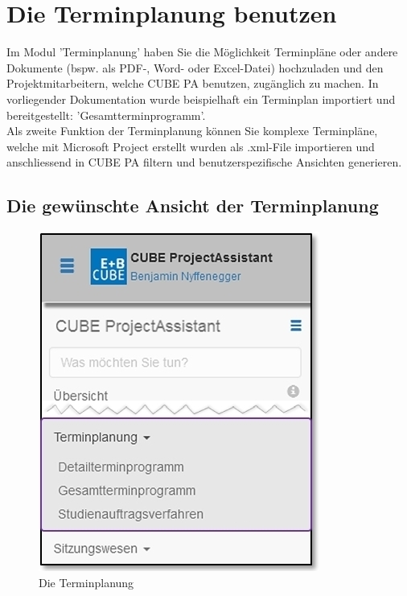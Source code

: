 
\pagebreak	
\section{Die Terminplanung benutzen}
\label{bkm:Ref445400921}
Im Modul 'Terminplanung' haben Sie die Möglichkeit Terminpläne oder andere Dokumente (bspw. als PDF-, Word- oder Excel-Datei) hochzuladen und den Projektmitarbeitern, welche CUBE PA benutzen, zugänglich zu machen. In vorliegender Dokumentation wurde beispielhaft ein Terminplan importiert und bereitgestellt: 'Gesamtterminprogramm'.\\
Als zweite Funktion der Terminplanung können Sie komplexe Terminpläne, welche mit Microsoft Project erstellt wurden als .xml-File importieren und anschliessend in CUBE PA filtern und benutzerspezifische Ansichten generieren.

\subsection{Die gewünschte Ansicht der Terminplanung}

\begin{figure}   %
  \vspace{-35pt}      %
  \begin{center}
    \includegraphics[width=1\linewidth]{../chapters/04_Terminplanung/pictures/4-1_Menu_Terminplanung.jpg}
  \end{center}
  \vspace{-20pt}
  \caption{Die Terminplanung}
  \vspace{-10pt}
\end{figure}

